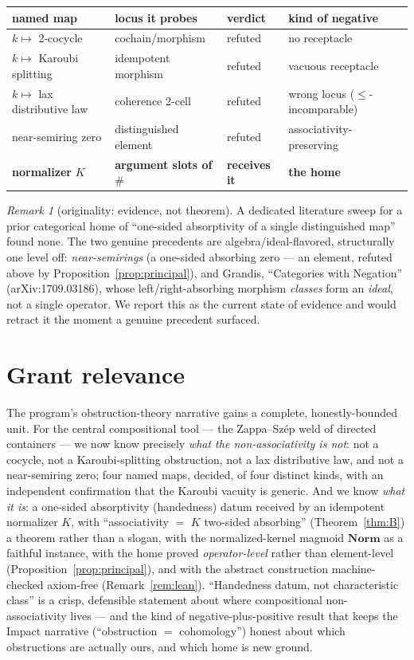 \documentclass[11pt]{amsart}
\theoremstyle{plain}
\theoremstyle{definition}
\theoremstyle{remark}
\newtheorem{remark}[theorem]{Remark}
\newcommand{\Norm}{\mathbf{Norm}}
\newcommand{\sh}{\mathbin{\#}}
\begin{document}
\begin{center}
\begin{tabular}{llll}
\hline
named map & locus it probes & verdict & kind of negative \\
\hline
$k\mapsto$ 2-cocycle & cochain/morphism & refuted & no receptacle \\
$k\mapsto$ Karoubi splitting & idempotent morphism & refuted & vacuous receptacle \\
$k\mapsto$ lax distributive law & coherence 2-cell & refuted & wrong locus ($\le$-incomparable) \\
near-semiring zero & distinguished element & refuted & associativity-preserving \\
\textbf{normalizer} $K$ & \textbf{argument slots of} $\sh$ & \textbf{receives it} & \textbf{the home} \\
\hline
\end{tabular}
\end{center}

\begin{remark}[originality: evidence, not theorem]
\label{rem:originality}
A dedicated literature sweep for a prior categorical home of ``one-sided absorptivity of a single
distinguished map'' found none. The two genuine precedents are algebra/ideal-flavored, structurally
one level off: \emph{near-semirings} (a one-sided absorbing zero --- an element, refuted above by
Proposition~\ref{prop:principal}), and Grandis, ``Categories with Negation'' (arXiv:1709.03186),
whose left/right-absorbing morphism \emph{classes} form an \emph{ideal}, not a single operator. We
report this as the current state of evidence and would retract it the moment a genuine precedent
surfaced.
\end{remark}

\section{Grant relevance}

The program's obstruction-theory narrative gains a complete, honestly-bounded unit. For the central
compositional tool --- the Zappa--Sz\'ep weld of directed containers --- we now know precisely
\emph{what the non-associativity is not}: not a cocycle, not a Karoubi-splitting obstruction, not a
lax distributive law, and not a near-semiring zero; four named maps, decided, of four distinct kinds,
with an independent confirmation that the Karoubi vacuity is generic. And we know \emph{what it is}:
a one-sided absorptivity (handedness) datum received by an idempotent normalizer $K$, with
``associativity $=$ $K$ two-sided absorbing'' (Theorem~\ref{thm:B}) a theorem rather than a slogan,
with the normalized-kernel magmoid $\Norm$ as a faithful instance, with the home proved
\emph{operator-level} rather than element-level (Proposition~\ref{prop:principal}), and with the
abstract construction machine-checked axiom-free (Remark~\ref{rem:lean}). ``Handedness datum, not
characteristic class'' is a crisp, defensible statement about where compositional non-associativity
lives --- and the kind of negative-plus-positive result that keeps the Impact narrative (``obstruction
$=$ cohomology'') honest about which obstructions are actually ours, and which home is new ground.
\end{document}
